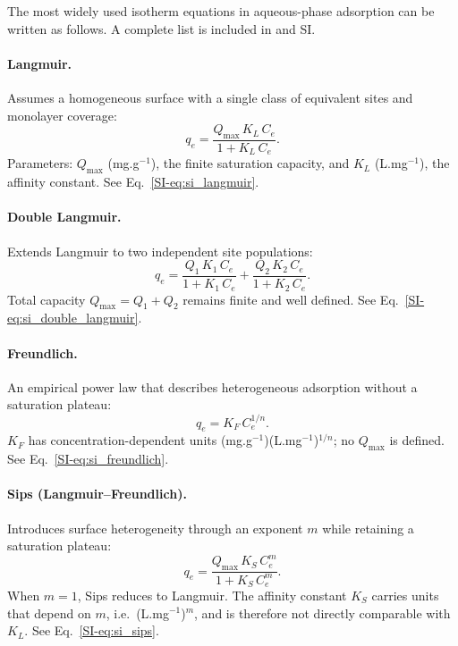 \documentclass[journal=jacsat,manuscript=article]{achemso}
\begin{document}
	The most widely used isotherm equations in aqueous-phase adsorption can be written as follows. A complete list is included in   and SI.

\paragraph{Langmuir.}
Assumes a homogeneous surface with a single class of equivalent sites and monolayer coverage:
\begin{equation}
	q_e = \frac{Q_{\max}\, K_L\, C_e}{1 + K_L\, C_e}.
	\label{eq:langmuir}
\end{equation}
Parameters: $Q_{\max}$ (mg.g$^{-1}$), the finite saturation capacity, and $K_L$ (L.mg$^{-1}$), the affinity constant.
See Eq.~\eqref{SI-eq:si_langmuir}.

\paragraph{Double Langmuir.}
Extends Langmuir to two independent site populations:
\begin{equation}
	q_e = \frac{Q_1\, K_1\, C_e}{1 + K_1\, C_e}
	    + \frac{Q_2\, K_2\, C_e}{1 + K_2\, C_e}.
	\label{eq:double_langmuir}
\end{equation}
Total capacity $Q_{\max} = Q_1 + Q_2$ remains finite and well defined.
See Eq.~\eqref{SI-eq:si_double_langmuir}.

\paragraph{Freundlich.}
An empirical power law that describes heterogeneous adsorption without a saturation plateau:
\begin{equation}
	q_e = K_F\, C_e^{1/n}.
	\label{eq:freundlich}
\end{equation}
$K_F$ has concentration-dependent units (mg.g$^{-1}$)(L.mg$^{-1}$)$^{1/n}$; no $Q_{\max}$ is defined.
See Eq.~\eqref{SI-eq:si_freundlich}.

	\paragraph{Sips (Langmuir--Freundlich).}
	Introduces surface heterogeneity through an exponent $m$ while retaining a saturation plateau:
	\begin{equation}
		q_e = \frac{Q_{\max}\,K_S\, C_e^{m}}{1 + K_S\, C_e^{m}}.
		\label{eq:sips}
	\end{equation}
	When $m = 1$, Sips reduces to Langmuir. The affinity constant $K_S$ carries units that depend on $m$, i.e.\ (L.mg$^{-1}$)$^{m}$, and is therefore not directly comparable with $K_L$.
	See Eq.~\eqref{SI-eq:si_sips}.
\end{document}
